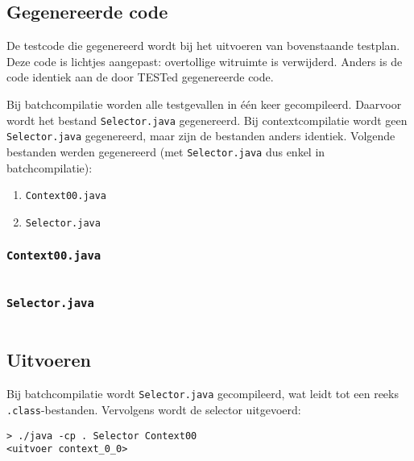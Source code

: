 \inputminted{java}{sources/echo-function/correct.java}

\subsection{Gegenereerde code}\label{subsec:echo-function-java-gegenereerde-code}

De testcode die gegenereerd wordt bij het uitvoeren van bovenstaande testplan.
Deze code is lichtjes aangepast: overtollige witruimte is verwijderd.
Anders is de code identiek aan de door TESTed gegenereerde code.

Bij batchcompilatie worden alle testgevallen in één keer gecompileerd.
Daarvoor wordt het bestand \texttt{Selector.java} gegenereerd.
Bij contextcompilatie wordt geen \texttt{Selector.java} gegenereerd, maar zijn de bestanden anders identiek.
Volgende bestanden werden gegenereerd (met \texttt{Selector.java} dus enkel in batchcompilatie):

\begin{enumerate}
    \item \texttt{Context00.java}
    \item \texttt{Selector.java}
\end{enumerate}

\subsubsection{\texttt{Context00.java}}

\inputminted{java}{sources/echo-function/Context00.java}

\subsubsection{\texttt{Selector.java}}

\inputminted{java}{sources/echo-function/Selector.java}

\subsection{Uitvoeren}\label{subsec:echo-function-java-uitvoeren}

Bij batchcompilatie wordt \texttt{Selector.java} gecompileerd, wat leidt tot een reeks \texttt{.class}-bestanden.
Vervolgens wordt de selector uitgevoerd:

\begin{verbatim}
> ./java -cp . Selector Context00
<uitvoer context_0_0>
\end{verbatim}

